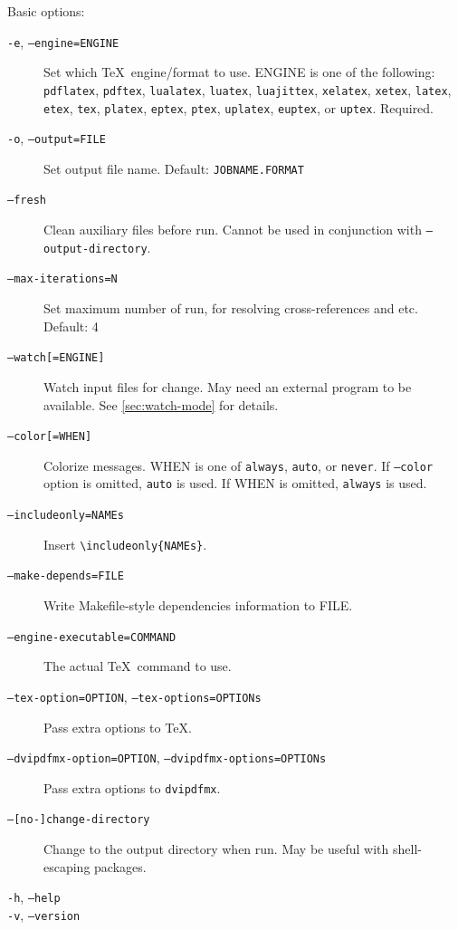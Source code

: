 \documentclass[a4paper]{report}
\newcommand\texcmd[1]{\texttt{\textbackslash #1}}
\newcommand\metavar[1]{\textnormal{\textsf{#1}}}
\begin{document}
Basic options:
\begin{description}
\item[\texttt{-e}, \texttt{--engine=\metavar{ENGINE}}]
  Set which \TeX\ engine/format to use.
  \metavar{ENGINE} is one of the following:
  \texttt{pdflatex}, \texttt{pdftex},
  \texttt{lualatex}, \texttt{luatex}, \texttt{luajittex},
  \texttt{xelatex}, \texttt{xetex},
  \texttt{latex}, \texttt{etex}, \texttt{tex},
  \texttt{platex}, \texttt{eptex}, \texttt{ptex},
  \texttt{uplatex}, \texttt{euptex}, or \texttt{uptex}.
  Required.
\item[\texttt{-o}, \texttt{--output=\metavar{FILE}}]
  Set output file name.
  Default: \texttt{\metavar{JOBNAME}.\metavar{FORMAT}}
\item[\texttt{--fresh}]
  Clean auxiliary files before run.
  Cannot be used in conjunction with \texttt{--output-directory}.
\item[\texttt{--max-iterations=\metavar{N}}]
  Set maximum number of run, for resolving cross-references and etc.
  Default: 4
\item[\texttt{--watch[=\metavar{ENGINE}]}]
  Watch input files for change.
  May need an external program to be available.
  See \autoref{sec:watch-mode} for details.
\item[\texttt{--color[=\metavar{WHEN}]}]
  Colorize messages.
  \metavar{WHEN} is one of \texttt{always}, \texttt{auto}, or \texttt{never}.
  If \texttt{--color} option is omitted, \texttt{auto} is used.
  If \metavar{WHEN} is omitted, \texttt{always} is used.
\item[\texttt{--includeonly=\metavar{NAMEs}}]
  Insert \texttt{\texcmd{includeonly}\{\metavar{NAMEs}\}}.
\item[\texttt{--make-depends=\metavar{FILE}}]
  Write Makefile-style dependencies information to \metavar{FILE}.
\item[\texttt{--engine-executable=\metavar{COMMAND}}]
  The actual \TeX\ command to use.
\item[\texttt{--tex-option=\metavar{OPTION}}, \texttt{--tex-options=\metavar{OPTIONs}}]
  Pass extra options to \TeX.
\item[\texttt{--dvipdfmx-option=\metavar{OPTION}}, \texttt{--dvipdfmx-options=\metavar{OPTIONs}}]
  Pass extra options to \texttt{dvipdfmx}.
\item[\texttt{--[no-]change-directory}]
  Change to the output directory when run.
  May be useful with shell-escaping packages.
\item[\texttt{-h}, \texttt{--help}]
\item[\texttt{-v}, \texttt{--version}]

\end{description}
\end{document}
